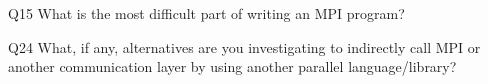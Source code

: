 \begin{description}%
\item{Q15} What is the most difficult part of writing an MPI program?%
\item{Q24} What, if any, alternatives are you investigating to indirectly call MPI or another communication layer by using another parallel language/library?%
\end{description}%

